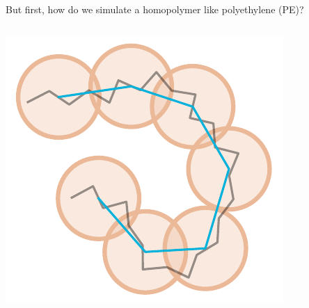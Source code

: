 \documentclass[aspectratio=169]{beamer}
\begin{document}
\begin{frame}[t]{But first, how do we simulate a homopolymer like polyethylene (PE)?}
{\begin{columns}[T]
    \column{0.5\paperwidth}
      \centering

      \includegraphics[height=0.9\textheight]{../figures/ch1_intro/fig-atom_to_CG_PE/subfig-long_CG_PE.pdf}

    \end{columns}
  }


\end{frame}
\end{document}
